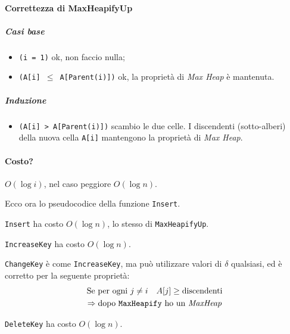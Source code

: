 \paragraph{Correttezza di MaxHeapifyUp}
\subparagraph{Casi base} 
\begin{itemize}
	\item[] \texttt{(i = 1)} ok, non faccio nulla;
	\item[] \texttt{(A[i] $\leq$ A[Parent(i)])} ok, la proprietà di \emph{Max Heap} è mantenuta.
\end{itemize}
\subparagraph{Induzione}
\begin{itemize}
	\item[] \texttt{(A[i] > A[Parent(i)])} scambio le due celle. I discendenti (sotto-alberi) della nuova
	cella \texttt{A[i]} mantengono la proprietà di \emph{Max Heap}.
\end{itemize}

\paragraph{Costo?} $O(\log i)$, nel caso peggiore $O(\log n)$.
\bigskip

Ecco ora lo pseudocodice della funzione \texttt{Insert}.

\texttt{Insert} ha costo $O(\log n)$, lo stesso di \texttt{MaxHeapifyUp}.


\texttt{IncreaseKey} ha costo $O(\log n)$.

 
\texttt{ChangeKey} è come \texttt{IncreaseKey}, ma può utilizzare valori di $\delta$ qualsiasi, ed è
corretto per la seguente proprietà:
\begin{gather*}
	\text{Se per ogni } j \neq i \quad A[j] \geq \text{discendenti} \\
	\Rightarrow \text{dopo \texttt{MaxHeapify} ho un \emph{MaxHeap}}
\end{gather*}


\texttt{DeleteKey} ha costo $O(\log n)$.